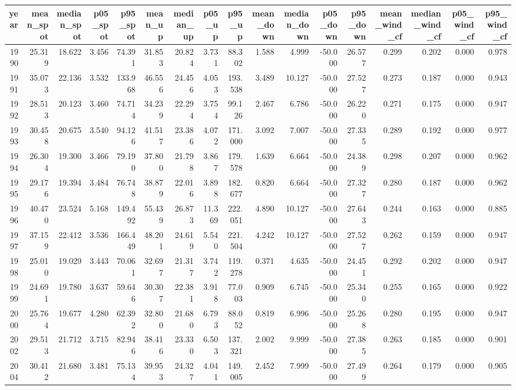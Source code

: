 \begin{tabular}{rrrrrrrrrrrrrrrrr}
\toprule
year & mean_spot & median_spot & p05_spot & p95_spot & mean_up & median_up & p05_up & p95_up & mean_down & median_down & p05_down & p95_down & mean_wind_cf & median_wind_cf & p05_wind_cf & p95_wind_cf \\
\midrule
1990 & 25.319 & 18.622 & 3.456 & 74.391 & 31.853 & 20.824 & 3.731 & 88.302 & 1.588 & 4.999 & -50.000 & 26.577 & 0.299 & 0.202 & 0.000 & 0.978 \\
1991 & 35.073 & 22.136 & 3.532 & 133.968 & 46.556 & 24.456 & 4.053 & 193.538 & 3.489 & 10.127 & -50.000 & 27.527 & 0.273 & 0.187 & 0.000 & 0.943 \\
1992 & 28.513 & 20.123 & 3.460 & 74.714 & 34.239 & 22.294 & 3.754 & 99.126 & 2.467 & 6.786 & -50.000 & 26.220 & 0.271 & 0.175 & 0.000 & 0.947 \\
1993 & 30.458 & 20.675 & 3.540 & 94.126 & 41.517 & 23.386 & 4.072 & 171.000 & 3.092 & 7.007 & -50.000 & 27.335 & 0.289 & 0.192 & 0.000 & 0.977 \\
1994 & 26.304 & 19.300 & 3.466 & 79.190 & 37.800 & 21.798 & 3.867 & 179.578 & 1.639 & 6.664 & -50.000 & 24.389 & 0.298 & 0.207 & 0.000 & 0.962 \\
1995 & 29.176 & 19.394 & 3.484 & 76.748 & 38.879 & 22.016 & 3.898 & 182.677 & 0.820 & 6.664 & -50.000 & 27.327 & 0.280 & 0.187 & 0.000 & 0.962 \\
1996 & 40.470 & 23.524 & 5.168 & 149.492 & 55.439 & 26.873 & 11.369 & 222.051 & 4.890 & 10.127 & -50.000 & 27.643 & 0.244 & 0.163 & 0.000 & 0.885 \\
1997 & 37.159 & 22.412 & 3.536 & 166.449 & 48.201 & 24.619 & 5.540 & 221.504 & 4.242 & 10.127 & -50.000 & 27.527 & 0.262 & 0.159 & 0.000 & 0.947 \\
1998 & 25.010 & 19.029 & 3.443 & 70.061 & 32.697 & 21.317 & 3.742 & 119.278 & 0.371 & 4.635 & -50.000 & 24.451 & 0.292 & 0.202 & 0.000 & 0.947 \\
1999 & 24.691 & 19.780 & 3.637 & 59.646 & 30.307 & 22.381 & 3.918 & 77.003 & 0.909 & 6.745 & -50.000 & 25.340 & 0.255 & 0.165 & 0.000 & 0.922 \\
2000 & 25.764 & 19.677 & 4.280 & 62.392 & 32.800 & 21.680 & 6.793 & 88.052 & 0.819 & 6.996 & -50.000 & 25.268 & 0.280 & 0.195 & 0.000 & 0.947 \\
2002 & 29.513 & 21.712 & 3.715 & 82.946 & 38.416 & 23.330 & 6.503 & 137.321 & 2.002 & 9.999 & -50.000 & 27.385 & 0.263 & 0.185 & 0.000 & 0.901 \\
2004 & 30.412 & 21.680 & 3.481 & 75.134 & 39.953 & 24.327 & 4.041 & 149.005 & 2.452 & 7.999 & -50.000 & 27.499 & 0.264 & 0.179 & 0.000 & 0.905 \\

\end{tabular}
